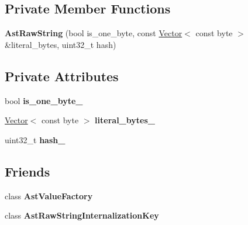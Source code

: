 \subsection*{Private Member Functions}
\begin{DoxyCompactItemize}
\item 
{\bfseries Ast\+Raw\+String} (bool is\+\_\+one\+\_\+byte, const \hyperlink{classv8_1_1internal_1_1_vector}{Vector}$<$ const byte $>$ \&literal\+\_\+bytes, uint32\+\_\+t hash)\hypertarget{classv8_1_1internal_1_1_ast_raw_string_ac0efb25675ec085123debaa5ea6468cf}{}\label{classv8_1_1internal_1_1_ast_raw_string_ac0efb25675ec085123debaa5ea6468cf}

\end{DoxyCompactItemize}
\subsection*{Private Attributes}
\begin{DoxyCompactItemize}
\item 
bool {\bfseries is\+\_\+one\+\_\+byte\+\_\+}\hypertarget{classv8_1_1internal_1_1_ast_raw_string_a75e78e94dc2549f879a4c174f6b78ad6}{}\label{classv8_1_1internal_1_1_ast_raw_string_a75e78e94dc2549f879a4c174f6b78ad6}

\item 
\hyperlink{classv8_1_1internal_1_1_vector}{Vector}$<$ const byte $>$ {\bfseries literal\+\_\+bytes\+\_\+}\hypertarget{classv8_1_1internal_1_1_ast_raw_string_a54926880cb090f53ebc404c0ab532b4b}{}\label{classv8_1_1internal_1_1_ast_raw_string_a54926880cb090f53ebc404c0ab532b4b}

\item 
uint32\+\_\+t {\bfseries hash\+\_\+}\hypertarget{classv8_1_1internal_1_1_ast_raw_string_aaf34997efdc82fdaf12e99e707380d54}{}\label{classv8_1_1internal_1_1_ast_raw_string_aaf34997efdc82fdaf12e99e707380d54}

\end{DoxyCompactItemize}
\subsection*{Friends}
\begin{DoxyCompactItemize}
\item 
class {\bfseries Ast\+Value\+Factory}\hypertarget{classv8_1_1internal_1_1_ast_raw_string_a1d507e13f196677ce9bdd7b29efd96c0}{}\label{classv8_1_1internal_1_1_ast_raw_string_a1d507e13f196677ce9bdd7b29efd96c0}

\item 
class {\bfseries Ast\+Raw\+String\+Internalization\+Key}\hypertarget{classv8_1_1internal_1_1_ast_raw_string_aa99ea383a648693891f30539a9b5faad}{}\label{classv8_1_1internal_1_1_ast_raw_string_aa99ea383a648693891f30539a9b5faad}

\end{DoxyCompactItemize}

